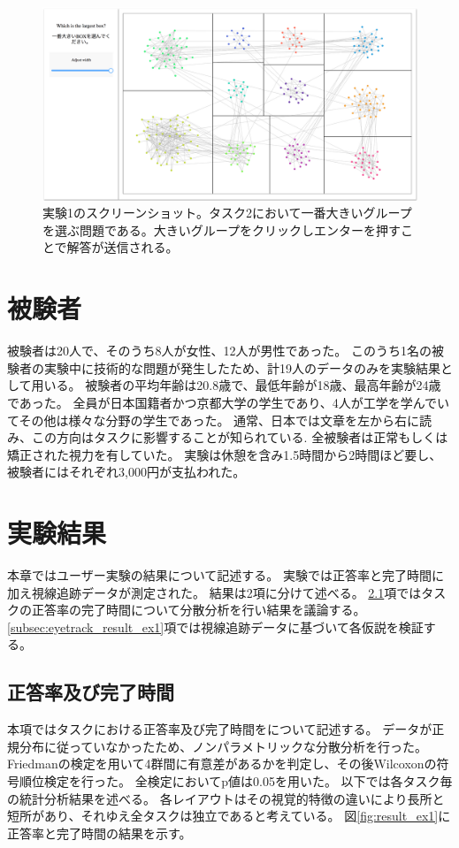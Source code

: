 \documentclass{kuee}
\begin{document}
\begin{figure}
  \centering
  \label{fig:screenshot_ex1}
  \includegraphics[width=15cm]{./images/screenshot.png}
  \caption{実験1のスクリーンショット。タスク2において一番大きいグループを選ぶ問題である。大きいグループをクリックしエンターを押すことで解答が送信される。}
\end{figure}

\section{被験者}
\label{sec:participants}
被験者は20人で、そのうち8人が女性、12人が男性であった。
このうち1名の被験者の実験中に技術的な問題が発生したため、計19人のデータのみを実験結果として用いる。
被験者の平均年齢は20.8歳で、最低年齢が18歳、最高年齢が24歳であった。
全員が日本国籍者かつ京都大学の学生であり、4人が工学を学んでいてその他は様々な分野の学生であった。
通常、日本では文章を左から右に読み、この方向はタスクに影響することが知られている\cite{yarbus1967eye}.
全被験者は正常もしくは矯正された視力を有していた。
実験は休憩を含み1.5時間から2時間ほど要し、被験者にはそれぞれ3,000円が支払われた。

\section{実験結果}
\label{sec:result_ex1}
本章ではユーザー実験の結果について記述する。
実験では正答率と完了時間に加え視線追跡データが測定された。
結果は2項に分けて述べる。
\ref{subsec:task_result_ex1}項ではタスクの正答率の完了時間について分散分析を行い結果を議論する。
\ref{subsec:eyetrack_result_ex1}項では視線追跡データに基づいて各仮説を検証する。

\subsection{正答率及び完了時間}
\label{subsec:task_result_ex1}
本項ではタスクにおける正答率及び完了時間をについて記述する。
データが正規分布に従っていなかったため、ノンパラメトリックな分散分析を行った。
Friedmanの検定を用いて4群間に有意差があるかを判定し、その後Wilcoxonの符号順位検定を行った。
全検定においてp値は0.05を用いた。
以下では各タスク毎の統計分析結果を述べる。
各レイアウトはその視覚的特徴の違いにより長所と短所があり、それゆえ全タスクは独立であると考えている。
図\ref{fig:result_ex1}に正答率と完了時間の結果を示す。
\end{document}
